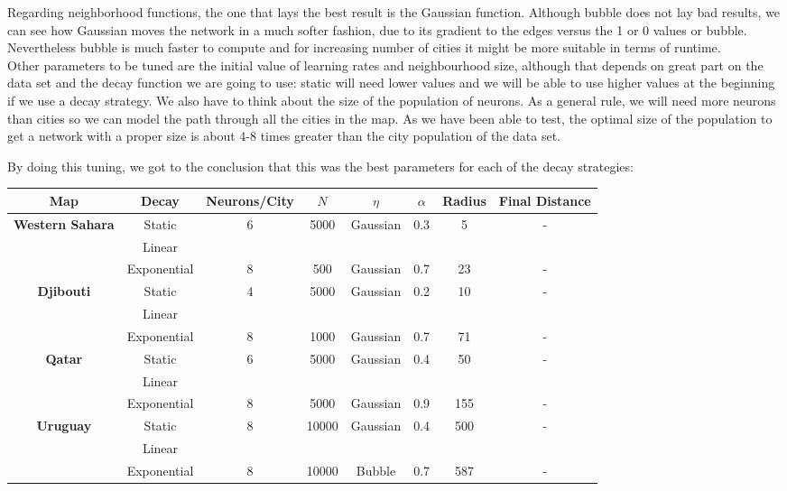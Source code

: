 \documentclass[11pt]{article}
\begin{document}
Regarding neighborhood functions, the one that lays the best result is the
Gaussian function. Although bubble does not lay bad results, we can see how
Gaussian moves the network in a much softer fashion, due to its gradient to the
edges versus the 1 or 0 values or bubble. Nevertheless bubble is much faster to
compute and for increasing number of cities it might be more suitable in terms
of runtime.\\

Other parameters to be tuned are the initial value of learning rates and
neighbourhood size, although that depends on great part on the data set and the
decay function we are going to use: static will need lower values and we will be
able to use higher values at the beginning if we use a decay strategy. We also
have to think about the size of the population of neurons. As a general rule, we
will need more neurons than cities so we can model the path through all the
cities in the map. As we have been able to test, the optimal size of the
population to get a network with a proper size is about 4-8 times greater than
the city population of the data set.\\

\newpage

By doing this tuning, we got to the conclusion that this was the best parameters
for each of the decay strategies:

\begin{table}[ht]
  \begin{center}
    \begin{tabular}{| c | c | c | c | c | c | c | c |}
      \hline
      Map & Decay & Neurons/City & $N$
      & $\eta$ & $\alpha$ & Radius & Final Distance\\
      \hline
      \hline
      \multirow{3}{*}{\textbf{Western Sahara}}
        & Static & 6 & 5000 & Gaussian & 0.3 & 5 & - \\
        & Linear &  \\
        & Exponential & 8 & 500 & Gaussian & 0.7 & 23 & - \\
      \hline
      \multirow{3}{*}{\textbf{Djibouti}}
        & Static & 4 & 5000 & Gaussian & 0.2 & 10 & - \\
        & Linear &  \\
        & Exponential & 8 & 1000 & Gaussian & 0.7 & 71 & - \\
      \hline
      \multirow{3}{*}{\textbf{Qatar}}
        & Static & 6 & 5000 & Gaussian & 0.4 & 50 & - \\
        & Linear &  \\
        & Exponential & 8 & 5000 & Gaussian & 0.9 & 155 & - \\
      \hline
      \multirow{3}{*}{\textbf{Uruguay}}
        & Static & 8 & 10000 & Gaussian & 0.4 & 500 & - \\
        & Linear &  \\
        & Exponential & 8 & 10000 & Bubble & 0.7 & 587 & - \\
      \hline
    \end{tabular}
  \end{center}
\end{table}
\end{document}

